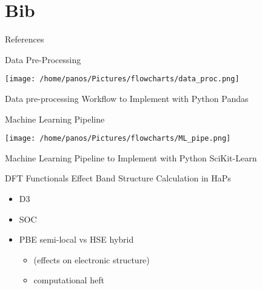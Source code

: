 \documentclass[10pt, aspectratio=169, presentation]{beamer}
\begin{document}
\section{Bib}
\label{sec:orgc074de6}
\begin{frame}[allowframebreaks]{References}
\AtNextBibliography{\tiny}
\printbibliography
\end{frame}
\appendix
\begin{frame}[label={sec:orga9e2c3c}]{Data Pre-Processing}
\begin{center}
\texttt{[image: /home/panos/Pictures/flowcharts/data\_proc.png]}
\end{center}
Data pre-processing Workflow to Implement with Python Pandas
\end{frame}
\begin{frame}[label={sec:org70807f8}]{Machine Learning Pipeline}
\begin{center}
\texttt{[image: /home/panos/Pictures/flowcharts/ML\_pipe.png]}
\end{center}
Machine Learning Pipeline to Implement with Python SciKit-Learn
\end{frame}
\begin{frame}[label={sec:org075e190}]{DFT Functionals Effect Band Structure Calculation in HaPs}
\begin{itemize}
\item D3
\item SOC
\item PBE semi-local vs HSE hybrid
\begin{itemize}
\item (effects on electronic structure)
\item computational heft
\end{itemize}
\end{itemize}
\end{frame}
\end{document}
